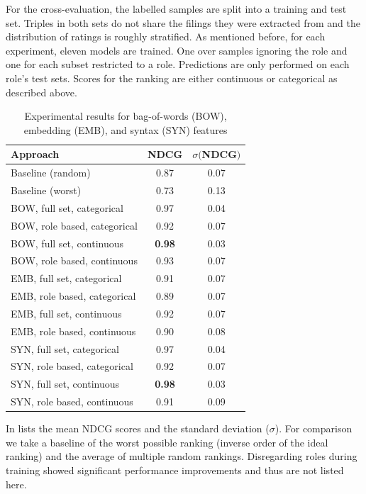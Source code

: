 For the cross-evaluation, the labelled samples are split into a training and test set.
Triples in both sets do not share the filings they were extracted from and the distribution of ratings is roughly stratified.
As mentioned before, for each experiment, eleven models are trained. One over samples ignoring the role and one for each subset restricted to a role.
Predictions are only performed on each role's test sets.
Scores for the ranking are either continuous or categorical as described above.

\begin{table}
	\caption{Experimental results for bag-of-words (BOW), embedding (EMB), and syntax (SYN) features}
	\label{tab:results}
	\begin{tabular}{lcc}
		\toprule
		Approach & NDCG & $\sigma ($NDCG$)$\\
		\midrule
		Baseline (random) & 0.87 & 0.07\\
		Baseline (worst) & 0.73 & 0.13\\
		\midrule
		BOW, full set, categorical & 0.97 & 0.04 \\
		BOW, role based, categorical & 0.92 & 0.07  \\
		BOW, full set, continuous & \textbf{0.98} & 0.03 \\
		BOW, role based, continuous & 0.93 & 0.07 \\
		\midrule
		EMB, full set, categorical & 0.91 & 0.07 \\
		EMB, role based, categorical & 0.89 & 0.07  \\
		EMB, full set, continuous & 0.92 & 0.07 \\
		EMB, role based, continuous & 0.90 & 0.08 \\
		\midrule
		SYN, full set, categorical & 0.97 & 0.04 \\
		SYN, role based, categorical & 0.92 & 0.07  \\
		SYN, full set, continuous & \textbf{0.98} & 0.03 \\
		SYN, role based, continuous & 0.91 & 0.09 \\
		\bottomrule
	\end{tabular}
\end{table}

In  lists the mean NDCG scores and the standard deviation ($\sigma$).
For comparison we take a baseline of the worst possible ranking (inverse order of the ideal ranking) and the average of multiple random rankings.
Disregarding roles during training showed significant performance improvements and thus are not listed here.

